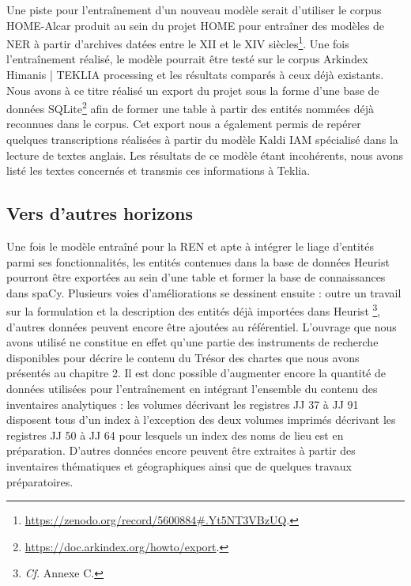 \documentclass[a4paper,12pt,twoside]{book}
\begin{document}
	Une piste pour l'entraînement d'un nouveau modèle serait d'utiliser le corpus HOME-Alcar produit au sein du projet HOME  pour entraîner des modèles de NER à partir d'archives datées entre le XII\ieme{} et le XIV\ieme{} siècles\footnote{\url{https://zenodo.org/record/5600884\#.Yt5NT3VBzUQ}.}. Une fois l'entraînement réalisé, le modèle pourrait être testé sur le corpus Arkindex \og Himanis | TEKLIA processing\fg{} et les résultats comparés à ceux déjà existants. Nous avons à ce titre réalisé un export du projet sous la forme d'une base de données SQLite\footnote{\url{https://doc.arkindex.org/howto/export}.} afin de former une table à partir des entités nommées déjà reconnues dans le corpus. Cet export nous a également permis de repérer quelques transcriptions réalisées à partir du modèle \og Kaldi IAM\fg{} spécialisé dans la lecture de textes anglais. Les résultats de ce modèle étant incohérents, nous avons listé les textes concernés et transmis ces informations à Teklia.
	
	\subsection{Vers d'autres horizons}
	
	Une fois le modèle entraîné pour la REN et apte à intégrer le liage d'entités parmi ses fonctionnalités, les entités contenues dans la base de données Heurist pourront être exportées au sein d'une table et former la base de connaissances dans spaCy. Plusieurs voies d'améliorations se dessinent ensuite : outre un travail sur la formulation et la description des entités déjà importées dans Heurist \footnote{\textit{Cf}. Annexe C.}, d'autres données peuvent encore être ajoutées au référentiel. L'ouvrage que nous avons utilisé ne constitue en effet qu'une partie des instruments de recherche disponibles pour décrire le contenu du Trésor des chartes que nous avons présentés au chapitre 2. Il est donc possible d'augmenter encore la quantité de données utilisées pour l'entraînement en intégrant l'ensemble du contenu des inventaires analytiques : les volumes décrivant les registres JJ 37 à JJ 91 disposent tous d'un index à l'exception des deux volumes imprimés décrivant les registres JJ 50 à JJ 64 pour lesquels un index des noms de lieu est en préparation. D'autres données encore peuvent être extraites à partir des inventaires thématiques et géographiques ainsi que de quelques travaux préparatoires. 
	
\end{document}
